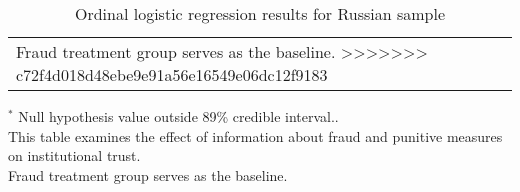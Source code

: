 \begin{table}[h]
\begin{center}
\begin{threeparttable}
\begin{tabular}{l c c c c}
{{Fraud treatment group serves as the baseline.}}
>>>>>>> c72f4d018d48ebe9e91a56e16549e06dc12f9183
\end{tabular}
\begin{tablenotes}[flushleft]
\scriptsize{$^*$ Null hypothesis value outside 89\% credible interval..
  \\
This table examines the effect of information about fraud and punitive measures on institutional trust.
  \\
Fraud treatment group serves as the baseline.}
\end{tablenotes}
\end{threeparttable}
\caption{Ordinal logistic regression results for Russian sample}
\label{table:coefficients}
\end{center}
\end{table}

